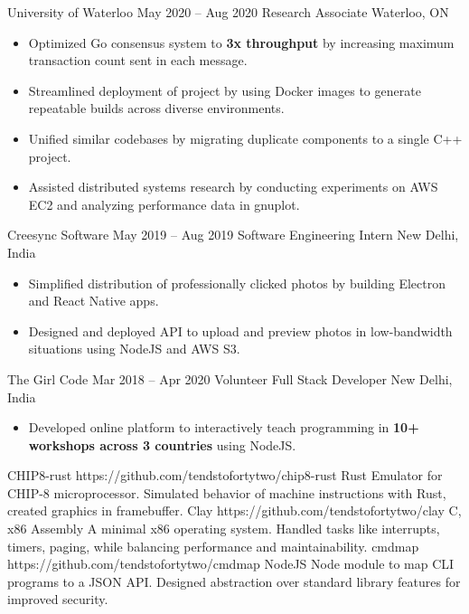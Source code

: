 \documentclass{article}
\begin{document}
\WorkEntry
  {University of Waterloo}
  {May 2020 -- Aug 2020}
  {Research Associate \hfill Waterloo, ON}
  {
    \begin{itemize} \itemsep -1pt
      \item Optimized Go consensus system to \textbf{3x throughput} by increasing maximum transaction count sent in each message.
      \item Streamlined deployment of project by using Docker images to generate repeatable builds across diverse environments.
      \item Unified similar codebases by migrating duplicate components to a single  C++ project.
      \item Assisted distributed systems research by conducting experiments on AWS EC2 and analyzing performance data in gnuplot.
    \end{itemize}
  }
\WorkEntry
  {Creesync Software}
  {May 2019 -- Aug 2019}
  {Software Engineering Intern \hfill New Delhi, India}
  {
    \begin{itemize} \itemsep -1pt
      \item Simplified distribution of professionally clicked photos by building Electron and React Native apps.
      \item Designed and deployed API to upload and preview photos in low-bandwidth situations using NodeJS and AWS S3.
    \end{itemize}
  }
\WorkEntry
  {The Girl Code}
  {Mar 2018 -- Apr 2020}
  {Volunteer Full Stack Developer \hfill New Delhi, India}
  {
    \begin{itemize} \itemsep -1pt
      \item Developed online platform to interactively teach programming in \textbf{10+ workshops across 3 countries} using NodeJS.
    \end{itemize}
  }

\ProjectEntry
  {CHIP8-rust}
  {https://github.com/tendstofortytwo/chip8-rust}
  {Rust}
  {Emulator for CHIP-8 microprocessor. Simulated behavior of machine instructions with Rust, created graphics in framebuffer.}
\vspace{1.5mm}
\ProjectEntry
  {Clay}
  {https://github.com/tendstofortytwo/clay}
  {C, x86 Assembly}
  {A minimal x86 operating system. Handled tasks like interrupts, timers, paging, while balancing performance and maintainability.}
\vspace{1.5mm}
\ProjectEntry
  {cmdmap}
  {https://github.com/tendstofortytwo/cmdmap}
  {NodeJS}
  {Node module to map CLI programs to a JSON API. Designed abstraction over standard library features for improved security.}
\end{document}
